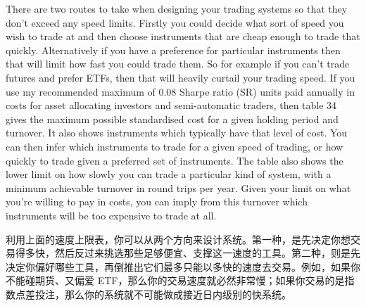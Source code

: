 \begin{englishblock} There are two routes to take when designing your trading systems so that they don't exceed any speed limits. Firstly you could decide what sort of speed you wish to trade at and then choose instruments that are cheap enough to trade that quickly. Alternatively if you have a preference for particular instruments then that will limit how fast you could trade them. So for example if you can't trade futures and prefer ETFs, then that will heavily curtail your trading speed. If you use my recommended maximum of 0.08 Sharpe ratio (SR) units paid annually in costs for asset allocating investors and semi-automatic traders, then table 34 gives the maximum possible standardised cost for a given holding period and turnover. It also shows instruments which typically have that level of cost. You can then infer which instruments to trade for a given speed of trading, or how quickly to trade given a preferred set of instruments. The table also shows the lower limit on how slowly you can trade a particular kind of system, with a minimum achievable turnover in round trips per year. Given your limit on what you're willing to pay in costs, you can imply from this turnover which instruments will be too expensive to trade at all. \end{englishblock}

\begin{chineseblock}利用上面的速度上限表，你可以从两个方向来设计系统。第一种，是先决定你想交易得多快，然后反过来挑选那些足够便宜、支撑这一速度的工具。第二种，则是先决定你偏好哪些工具，再倒推出它们最多只能以多快的速度去交易。例如，如果你不能碰期货、又偏爱 ETF，那么你的交易速度就必然非常慢；如果你交易的是指数点差投注，那么你的系统就不可能做成接近日内级别的快系统。\end{chineseblock}


